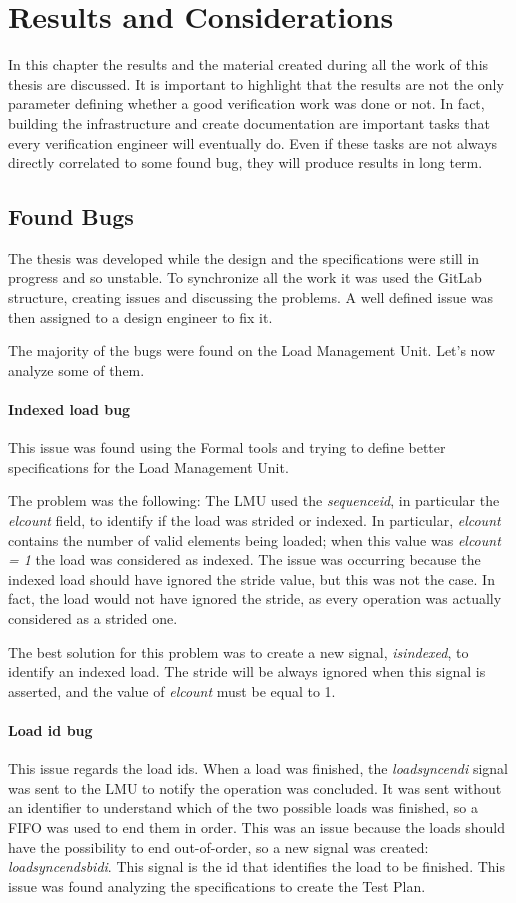 \chapter{Results and Considerations}
In this chapter the results and the material created during all the work of this thesis are discussed.
It is important to highlight that the results are not the only parameter defining whether a good verification work was done or not. In fact, building the infrastructure and create documentation are important tasks that every verification engineer will eventually do. Even if these tasks are not always directly correlated to some found bug, they will produce results in long term.


\section{Found Bugs}
The thesis was developed while the design and the specifications were still in progress and so unstable. To synchronize all the work it was used the GitLab structure, creating issues and discussing the problems. A well defined issue was then assigned to a design engineer to fix it.

The majority of the bugs were found on the Load Management Unit. Let's now analyze some of them.

\subsubsection{Indexed load bug}
This issue was found using the Formal tools and trying to define better specifications for the Load Management Unit.

The problem was the following:
The LMU used the \emph{sequence\+id}, in particular the \emph{el\+count} field, to identify if the load was strided or indexed. In particular, \emph{el\+count} contains the number of valid elements being loaded; when this value was \emph{el\+count = 1} the load was considered as indexed.
The issue was occurring because the indexed load should have ignored the stride value, but this was not the case. In fact, the load would not have ignored the stride, as every operation was actually considered as a strided one.

The best solution for this problem was to create a new signal, \emph{is\+indexed}, to identify an indexed load. The stride will be always ignored when this signal is asserted, and the value of \emph{el\+count} must be equal to 1.

\subsubsection{Load id bug}
This issue regards the load ids. When a load was finished, the \emph{load\+sync\+end\+i} signal was sent to the LMU to notify the operation was concluded.
It was sent without an identifier to understand which of the two possible loads was finished, so a FIFO was used to end them in order.
This was an issue because the loads should have the possibility to end out-of-order, so a new signal was created: \emph{load\+sync\+end\+sb\+id\+i}. This signal is the id that identifies the load to be finished.
This issue was found analyzing the specifications to create the Test Plan.

